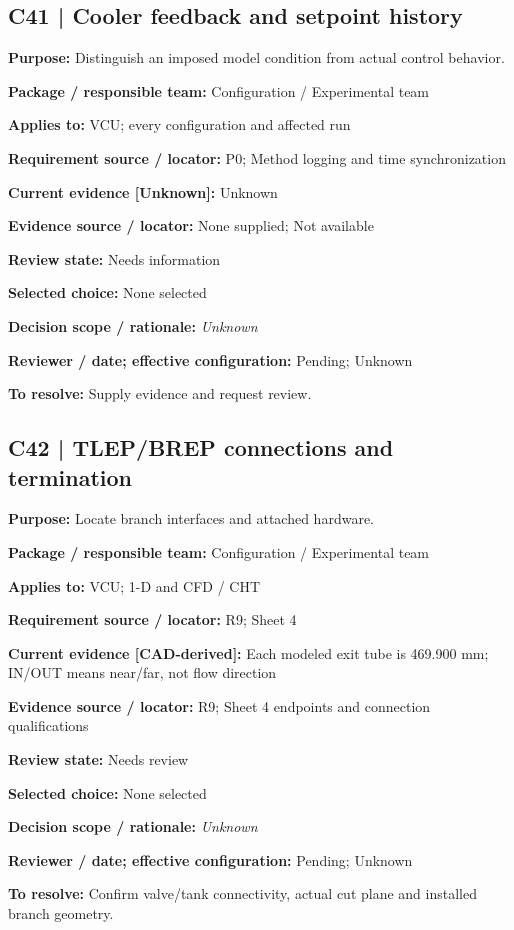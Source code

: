 \documentclass[11pt]{article}
\begin{document}
\begin{minipage}{\textwidth}\small\setlength{\parskip}{2pt}
\subsection*{C41 | Cooler feedback and setpoint history}
\textbf{Purpose:} Distinguish an imposed model condition from actual control behavior.\par
\textbf{Package / responsible team:} Configuration / Experimental team\par
\textbf{Applies to:} VCU; every configuration and affected run\par
\textbf{Requirement source / locator:} P0; Method logging and time synchronization\par
\textbf{Current evidence [Unknown]:} Unknown\par
\textbf{Evidence source / locator:} None supplied; Not available\par
\textbf{Review state:} Needs information\par
\textbf{Selected choice:} None selected\par
\textbf{Decision scope / rationale:} \textit{Unknown}\par
\textbf{Reviewer / date; effective configuration:} Pending; Unknown\par
\textbf{To resolve:} Supply evidence and request review.\par
\end{minipage}\par\vspace{5pt}
\begin{minipage}{\textwidth}\small\setlength{\parskip}{2pt}
\subsection*{C42 | TLEP/BREP connections and termination}
\textbf{Purpose:} Locate branch interfaces and attached hardware.\par
\textbf{Package / responsible team:} Configuration / Experimental team\par
\textbf{Applies to:} VCU; 1-D and CFD / CHT\par
\textbf{Requirement source / locator:} R9; Sheet 4\par
\textbf{Current evidence [CAD-derived]:} Each modeled exit tube is 469.900 mm; IN/OUT means near/far, not flow direction\par
\textbf{Evidence source / locator:} R9; Sheet 4 endpoints and connection qualifications\par
\textbf{Review state:} Needs review\par
\textbf{Selected choice:} None selected\par
\textbf{Decision scope / rationale:} \textit{Unknown}\par
\textbf{Reviewer / date; effective configuration:} Pending; Unknown\par
\textbf{To resolve:} Confirm valve/tank connectivity, actual cut plane and installed branch geometry.\par
\end{minipage}\par\vspace{5pt}
\end{document}
